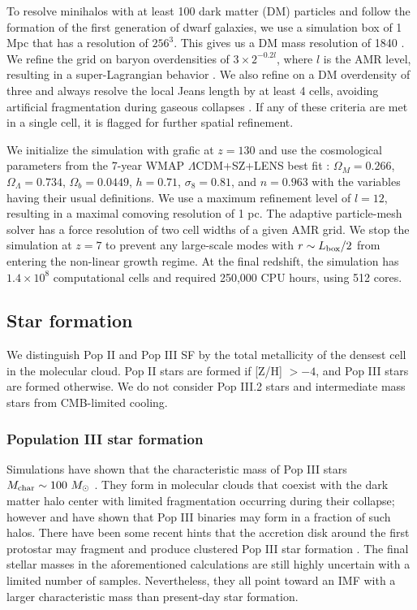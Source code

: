 \documentclass[12pt,preprint]{aastex}
\begin{document}
To resolve minihalos with at least 100 dark matter (DM) particles and
follow the formation of the first generation of dwarf galaxies, we use
a simulation box of 1 Mpc that has a resolution of $256^3$.  This
gives us a DM mass resolution of 1840 \Ms.  We refine the grid on
baryon overdensities of $3 \times 2^{-0.2l}$, where $l$ is the AMR
level, resulting in a super-Lagrangian behavior \citep[also
  see][]{OShea08}.  We also refine on a DM overdensity of three and
always resolve the local Jeans length by at least 4 cells, avoiding
artificial fragmentation during gaseous collapses \citep{Truelove97}.
If any of these criteria are met in a single cell, it is flagged for
further spatial refinement.

We initialize the simulation with grafic \citep{Bertschinger01} at $z
= 130$ and use the cosmological parameters from the 7-year WMAP
$\Lambda$CDM+SZ+LENS best fit \citep{WMAP7}: $\Omega_M = 0.266$,
$\Omega_\Lambda = 0.734$, $\Omega_b = 0.0449$, $h = 0.71$, $\sigma_8 =
0.81$, and $n = 0.963$ with the variables having their usual
definitions.  We use a maximum refinement level of $l = 12$, resulting
in a maximal comoving resolution of 1 pc.  The adaptive particle-mesh
solver has a force resolution of two cell widths of a given AMR grid.
We stop the simulation at $z=7$ to prevent any large-scale modes with
$r \sim L_{\rm box}/2$ from entering the non-linear growth regime.  At
the final redshift, the simulation has $1.4 \times 10^8$ computational
cells and required 250,000 CPU hours, using 512 cores.

\subsection{Star formation}

We distinguish Pop II and Pop III SF by the total metallicity of the
densest cell in the molecular cloud.  Pop II stars are formed if [Z/H]
$> -4$, and Pop III stars are formed otherwise.  We do not consider
Pop III.2 stars and intermediate mass stars from CMB-limited cooling.

\subsubsection{Population III star formation}

Simulations have shown that the characteristic mass of Pop III stars
$M_{\rm char} \sim 100~\Ms$ \citep{ABN02, Bromm02_P3, OShea07a,
  Yoshida08}.  They form in molecular clouds that coexist with the
dark matter halo center with limited fragmentation occurring during
their collapse; however \citet{2009Sci...325..601T} and
\citet{Stacy10_Binary} have shown that Pop III binaries may form in a
fraction of such halos.  There have been some recent hints that the
accretion disk around the first protostar may fragment and produce
clustered Pop III star formation \citep{Clark11_Frag,
  Greif11_P3Cluster}.  The final stellar masses in the aforementioned
calculations are still highly uncertain with a limited number of
samples.  Nevertheless, they all point toward an IMF with a larger
characteristic mass than present-day star formation.
\end{document}
